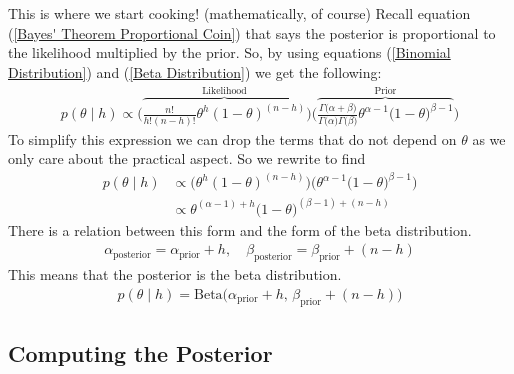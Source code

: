 \documentclass[11pt]{article}   %
\begin{document}
This is where we start cooking! (mathematically, of course) Recall equation (\ref{Bayes' Theorem Proportional Coin}) that says the posterior is proportional to the likelihood multiplied by the prior. So, by using equations (\ref{Binomial Distribution}) and (\ref{Beta Distribution}) we get the following:
\begin{align*}
p(\theta\mid h) \propto \bigg(\overbrace{\frac{n!}{h!(n - h)!}\theta^h(1 - \theta)^{(n-h)}}^\text{Likelihood}\bigg)\bigg(\overbrace{\frac{\Gamma\big(\alpha + \beta\big)}{\Gamma\big(\alpha\big)\Gamma\big(\beta\big)}\theta^{\alpha - 1}\big(1 - \theta\big)^{\beta - 1}}^\text{Prior}\bigg)
\end{align*}
To simplify this expression we can drop the terms that do not depend on $\theta$ as we only care about the practical aspect. So we rewrite to find
\begin{align*}
p(\theta\mid h) &\propto \Big(\theta^h(1 - \theta)^{(n-h)}\Big)\Big(\theta^{\alpha - 1}\big(1 - \theta\big)^{\beta - 1}\Big)\\
&\propto \theta^{(\alpha - 1) + h}\big(1 - \theta\big)^{(\beta - 1) + (n - h)}
\end{align*}
There is a relation between this form and the form of the beta distribution.
\begin{align*}
\alpha_\text{posterior} = \alpha_\text{prior} + h,\quad\beta_\text{posterior} = \beta_\text{prior} + (n - h)
\end{align*}
This means that the posterior is the beta distribution.
\begin{align*}
p(\theta\mid h) = \text{Beta}\big(\alpha_\text{prior} + h,\,\beta_\text{prior} + (n - h)\big)
\end{align*}
\subsection{Computing the Posterior}\label{Computing the Posterior}
\end{document}
